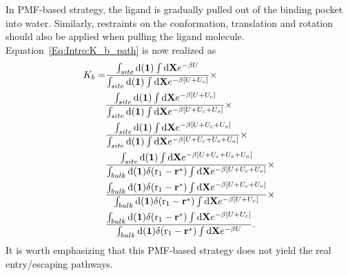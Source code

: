 In PMF-based strategy, the ligand is gradually pulled out of the binding pocket into water. Similarly, restraints on the conformation, translation and rotation should also be applied when pulling the ligand molecule. Equation~\ref{Eq:Intro:K_b_path} is now realized as
\begin{align}
K_b=&\frac{\int_{site}\diff(\mathbf{1})\int \diff\mathbf{X}e^{-\beta U}}{\int_{site}\diff(\mathbf{1})\int \diff\mathbf{X}e^{-\beta [U+U_c]}}\times\notag\\
    &\frac{\int_{site}\diff(\mathbf{1})\int \diff\mathbf{X}e^{-\beta [U+U_c]}}{\int_{site}\diff(\mathbf{1})\int \diff\mathbf{X}e^{-\beta [U+U_c+U_o]}}\times\notag\\
    &\frac{\int_{site}\diff(\mathbf{1})\int \diff\mathbf{X}e^{-\beta [U+U_c+U_o]}}{\int_{site}\diff(\mathbf{1})\int \diff\mathbf{X}e^{-\beta [U+U_c+U_o+U_a]}}\times\notag\\
    &\frac{\int_{site}\diff(\mathbf{1})\int \diff\mathbf{X}e^{-\beta [U+U_c+U_o+U_a]}}{\int_{bulk}\diff(\mathbf{1})\delta(\mathrm{r}_1-\mathbf{r}^*)\int \diff\mathbf{X}e^{-\beta [U+U_c+U_o]}}\times\notag\\
    &\frac{\int_{bulk}\diff(\mathbf{1})\delta(\mathrm{r}_1-\mathbf{r}^*)\int \diff\mathbf{X}e^{-\beta [U+U_c+U_o]}}{\int_{bulk}\diff(\mathbf{1})\delta(\mathrm{r}_1-\mathbf{r}^*)\int \diff\mathbf{X}e^{-\beta [U+U_c]}}\times\notag\\
    &\frac{\int_{bulk}\diff(\mathbf{1})\delta(\mathrm{r}_1-\mathbf{r}^*)\int \diff\mathbf{X}e^{-\beta [U+U_c]}}{\int_{bulk}\diff(\mathbf{1})\delta(\mathrm{r}_1-\mathbf{r}^*)\int \diff\mathbf{X}e^{-\beta U}}.
\end{align}
It is worth emphasizing that this PMF-based strategy does not yield the real entry/escaping pathways.